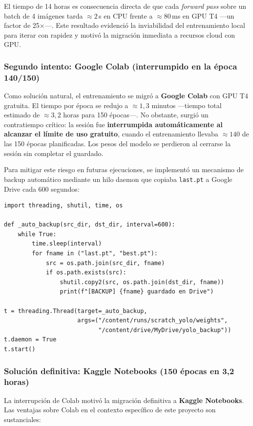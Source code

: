 \documentclass[12pt,a4paper]{article}
\begin{document}
El tiempo de 14 horas es consecuencia directa de que cada \emph{forward pass} sobre
un batch de 4 imágenes tarda $\approx 2\,$s en CPU frente a $\approx 80\,$ms en GPU T4
—un factor de 25×—. Este resultado evidenció la inviabilidad del entrenamiento local
para iterar con rapidez y motivó la migración inmediata a recursos cloud con GPU.

\subsubsection{Segundo intento: Google Colab (interrumpido en la época 140/150)}

Como solución natural, el entrenamiento se migró a \textbf{Google Colab} con GPU T4
gratuita. El tiempo por época se redujo a $\approx 1,3$ minutos —tiempo total estimado
de $\approx 3,2$ horas para 150 épocas—. No obstante, surgió un contratiempo crítico:
la sesión fue \textbf{interrumpida automáticamente al alcanzar el límite de uso
gratuito}, cuando el entrenamiento llevaba $\approx 140$ de las 150 épocas planificadas.
Los pesos del modelo se perdieron al cerrarse la sesión sin completar el guardado.

Para mitigar este riesgo en futuras ejecuciones, se implementó un mecanismo de backup
automático mediante un hilo daemon que copiaba \texttt{last.pt} a Google Drive cada
600 segundos:

\begin{lstlisting}[caption={Mecanismo de backup automático en Google Colab}]
import threading, shutil, time, os

def _auto_backup(src_dir, dst_dir, interval=600):
    while True:
        time.sleep(interval)
        for fname in ("last.pt", "best.pt"):
            src = os.path.join(src_dir, fname)
            if os.path.exists(src):
                shutil.copy2(src, os.path.join(dst_dir, fname))
                print(f"[BACKUP] {fname} guardado en Drive")

t = threading.Thread(target=_auto_backup,
                     args=("/content/runs/scratch_yolo/weights",
                           "/content/drive/MyDrive/yolo_backup"))
t.daemon = True
t.start()
\end{lstlisting}

\subsubsection{Solución definitiva: Kaggle Notebooks (150 épocas en 3,2 horas)}

La interrupción de Colab motivó la migración definitiva a \textbf{Kaggle Notebooks}.
Las ventajas sobre Colab en el contexto específico de este proyecto son sustanciales:
\end{document}
